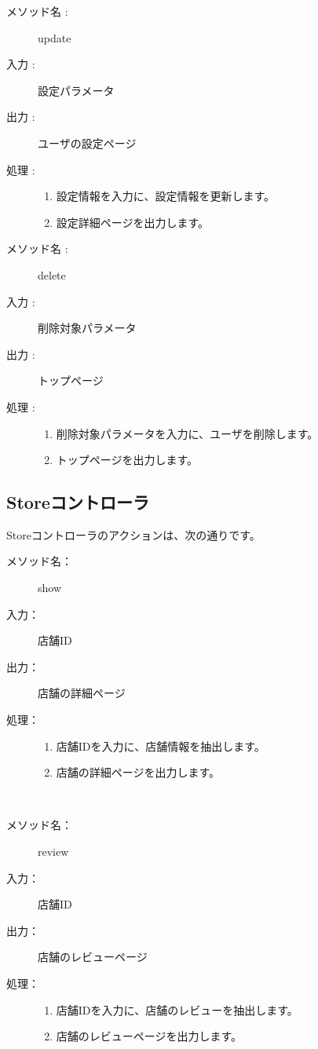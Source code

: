 \documentclass[a4j,titlepage]{jarticle}
\begin{document}
\clearpage

\begin{description}
\item [メソッド名 :] update
\item [入力 :] 設定パラメータ
\item [出力 :] ユーザの設定ページ
\item [処理 :]\mbox{}
  \begin{enumerate}
  \item 設定情報を入力に、設定情報を更新します。
  \item 設定詳細ページを出力します。
  \end{enumerate}
\end{description}

\begin{description}
\item [メソッド名 :] delete
\item [入力 :] 削除対象パラメータ
\item [出力 :] トップページ
\item [処理 :]\mbox{}
  \begin{enumerate}
    \item 削除対象パラメータを入力に、ユーザを削除します。
    \item トップページを出力します。
 \end{enumerate}
\end{description}


\subsection{Storeコントローラ}
Storeコントローラのアクションは、次の通りです。

\begin{description}
\item [メソッド名：] show
\item [入力：] 店舗ID
\item [出力：] 店舗の詳細ページ
\item [処理：]\mbox{}
  \begin{enumerate}
  \item 店舗IDを入力に、店舗情報を抽出します。
  \item 店舗の詳細ページを出力します。
  \end{enumerate}
\end{description}
​
\begin{description}
\item [メソッド名：] review
\item [入力：] 店舗ID
\item [出力：] 店舗のレビューページ
\item [処理：]\mbox{}
  \begin{enumerate}
  \item 店舗IDを入力に、店舗のレビューを抽出します。
  \item 店舗のレビューページを出力します。
  \end{enumerate}
\end{description}
\end{document}

